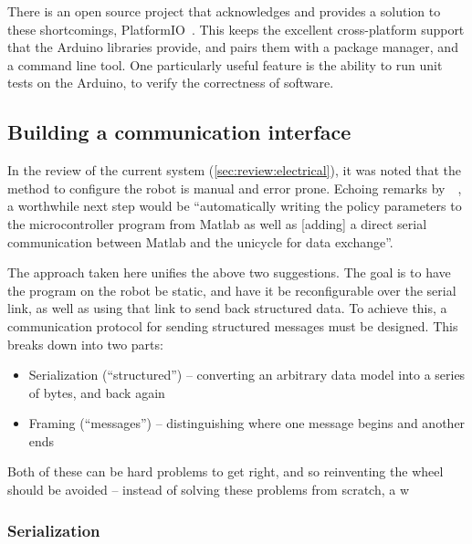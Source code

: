\documentclass[main.tex]{subfiles}
\begin{document}
	There is an open source project that acknowledges and provides a solution to these shortcomings, PlatformIO~\cite{platformio}.
	This keeps the excellent cross-platform support that the Arduino libraries provide, and pairs them with a package manager, and a command line tool.
	One particularly useful feature is the ability to run unit tests on the Arduino, to verify the correctness of software.

\subsection{Building a communication interface}
	\label{sec:comms}

	In the review of the current system (\cref{sec:review:electrical}), it was noted that the method to configure the robot is manual and error prone.
	Echoing remarks by~\citeauthor{aleksi}~\cite[p.~34]{aleksi}, a worthwhile next step would be \enquote{automatically writing the policy parameters to the microcontroller program from Matlab as well as [adding] a direct serial communication between Matlab and the unicycle for data exchange}.

	The approach taken here unifies the above two suggestions.
	The goal is to have the program on the robot be static, and have it be reconfigurable over the serial link, as well as using that link to send back structured data.
	To achieve this, a communication protocol for sending structured messages must be designed. This breaks down into two parts:
	\begin{itemize}[noitemsep]
		\item Serialization (\enquote{structured}) -- converting an arbitrary data model into a series of bytes, and back again
		\item Framing (\enquote{messages}) -- distinguishing where one message begins and another ends
	\end{itemize}
	Both of these can be hard problems to get right, and so reinventing the wheel should be avoided -- instead of solving these problems from scratch, a w

	\subsubsection{Serialization}
\end{document}
